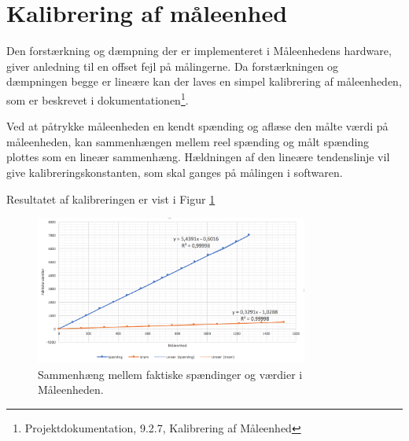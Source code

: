 
\section{Kalibrering af måleenhed}

Den forstærkning og dæmpning der er implementeret i Måleenhedens hardware, giver anledning til en offset fejl på målingerne. Da forstærkningen og dæmpningen begge er lineære kan der laves en simpel kalibrering af måleenheden, som er beskrevet i dokumentationen\footnote{Projektdokumentation, 9.2.7, Kalibrering af Måleenhed}.\newline

Ved at påtrykke måleenheden en kendt spænding og aflæse den målte værdi på måleenheden, kan sammenhængen mellem reel spænding og målt spænding plottes som en lineær sammenhæng. Hældningen af den lineære tendenslinje vil give kalibreringskonstanten, som skal ganges på målingen i softwaren. 

Resultatet af kalibreringen er vist i Figur \ref{fig:MEgraf}

\begin{figure}[H]
	\centering
	\includegraphics[width=0.80\textwidth]{figure/MEkalibreringgraf}
	\caption{Sammenhæng mellem faktiske spændinger og værdier i Måleenheden.}
	\label{fig:MEgraf}
\end{figure}